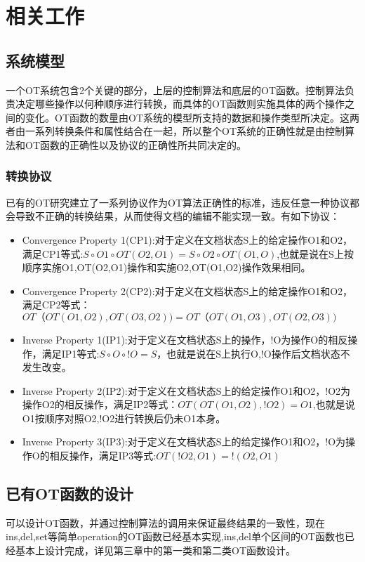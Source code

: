 \chapter{相关工作}
\section{系统模型}
	\par 一个OT系统包含2个关键的部分，上层的控制算法和底层的OT函数。控制算法负责决定哪些操作以何种顺序进行转换，而具体的OT函数则实施具体的两个操作之间的变化。OT函数的数量由OT系统的模型所支持的数据和操作类型所决定。这两者由一系列转换条件和属性结合在一起，所以整个OT系统的正确性就是由控制算法和OT函数的正确性以及协议的正确性所共同决定的。
\subsection{转换协议}
	\par 已有的OT研究建立了一系列协议作为OT算法正确性的标准，违反任意一种协议都会导致不正确的转换结果，从而使得文档的编辑不能实现一致。有如下协议：
	\begin{itemize}
	\item Convergence Property 1(CP1):对于定义在文档状态S上的给定操作O1和O2，满足CP1等式:$S \circ O1 \circ OT(O2,O1) = S \circ O2 \circ OT(O1,O)$,也就是说在S上按顺序实施O1,OT(O2,O1)操作和实施O2,OT(O1,O2)操作效果相同。
	\item Convergence Property 2(CP2):对于定义在文档状态S上的给定操作O1和O2，满足CP2等式：$OT（OT(O1,O2),OT(O3,O2)) = OT（OT(O1,O3),OT(O2,O3))$
	\item Inverse Property 1(IP1):对于定义在文档状态S上的操作，!O为操作O的相反操作，满足IP1等式:$S \circ O \circ !O = S$，也就是说在S上执行O,!O操作后文档状态不发生改变。
	\item Inverse Property 2(IP2):对于定义在文档状态S上的给定操作O1和O2，!O2为操作O2的相反操作，满足IP2等式：$OT(OT(O1,O2),!O2) = O1$,也就是说O1按顺序对照O2,!O2进行转换后仍未O1本身。
	\item Inverse Property 3(IP3):对于定义在文档状态S上的给定操作O1和O2，!O为操作O的相反操作，满足IP3等式:$OT(!O2,O1)=!(O2,O1)$
	\end{itemize}
	
\section{已有OT函数的设计}
	\par 可以设计OT函数，并通过控制算法的调用来保证最终结果的一致性，现在ins,del,set等简单operation的OT函数已经基本实现,ins,del单个区间的OT函数也已经基本上设计完成，详见第三章中的第一类和第二类OT函数设计。
	
	